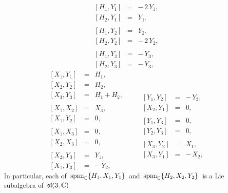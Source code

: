 \begin{lemma}
\begin{equation*}
\begin{array}{ccr}
\left[H_{1},Y_{1}\right] &=& -\,2\,Y_{1},
\\
\left[H_{2},Y_{1}\right] &=& Y_{1},
\\ \\
\left[H_{1},Y_{2}\right] &=& Y_{2},
\\
\left[H_{2},Y_{2}\right] &=& -\,2\,Y_{2},
\\ \\
\left[H_{1},Y_{3}\right] &=& -\,Y_{3},
\\
\left[H_{2},Y_{3}\right] &=& -\,Y_{3},
\end{array}
\end{equation*}
\begin{equation*}
\begin{array}{ccr}
\left[X_{1},Y_{1}\right] &=& H_{1},
\\
\left[X_{2},Y_{2}\right] &=& H_{2},
\\
\left[X_{3},Y_{3}\right] &=& H_{1}+H_{2},
\\ \\
\left[X_{1},X_{2}\right] &=& X_{3},
\\
\left[X_{1},Y_{2}\right] &=& 0,
\\ \\
\left[X_{1},X_{3}\right] &=& 0,
\\
\left[X_{2},X_{3}\right] &=& 0,
\\ \\
\left[X_{2},Y_{3}\right] &=& Y_{1},
\\
\left[X_{1},Y_{3}\right] &=& -\,Y_{2},
\end{array}
\quad\quad
\begin{array}{ccr}
&&
\\
&&
\\
&&
\\ \\
\left[Y_{1},Y_{2}\right] &=& -\,Y_{3},
\\
\left[X_{2},Y_{1}\right] &=& 0,
\\ \\
\left[Y_{1},Y_{3}\right] &=& 0,
\\
\left[Y_{2},Y_{3}\right] &=& 0,
\\ \\
\left[X_{3},Y_{2}\right] &=& X_{1},
\\
\left[X_{3},Y_{1}\right] &=& -\,X_{2},
\end{array}
\end{equation*}
In particular, each of
\,$\textnormal{span}_{\mathbb{C}}\{H_{1},X_{1},Y_{1}\}$\,
and
\,$\textnormal{span}_{\mathbb{C}}\{H_{2},X_{2},Y_{2}\}$\,
is a Lie subalgebra of \,$\mathfrak{sl}(3,\mathbb{C})$\,

\end{lemma}

